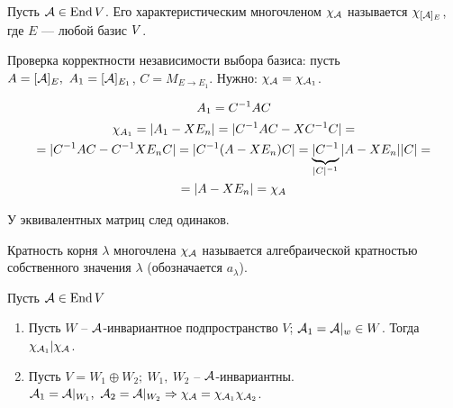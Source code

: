 \documentclass[main]{subfiles}
\begin{document}
\begin{definition}
    Пусть $\mathcal{A} \in \operatorname{End} V$. Его характеристическим многочленом $\chi_{\mathcal{A}}$ называется
    $\chi_{[\mathcal{A}]_E}$, где $E$  — любой базис $V$.
\end{definition}

Проверка корректности независимости выбора базиса: пусть $A = [\mathcal{A}]_E,\ A_1 = [\mathcal{A}]_{E_1}$,
$C = M_{E \rightarrow E_1}$. Нужно: $\chi_{\mathcal{A}} = \chi_{\mathcal{A}_1}$.

\[A_1 = C^{-1}A C\]
\begin{multline*}
    \chi_{A_1} = |A_1 - X E_n| =
    |C^{-1}A C - XC^{-1}C| = \\ = |C^{-1}A C - C^{-1}XE_nC| =
    |C^{-1}(A - XE_n) C| = \underbrace{|C^{-1}}_{|C|^{-1}}|A - XE_n||C| = \\ =
    |A - XE_n| = \chi_{A}
\end{multline*}

У эквивалентных матриц след одинаков.


\begin{definition} 
    Кратность корня $\lambda$ многочлена $\chi_{\mathcal{A}}$ называется алгебраической кратностью собственного значения $\lambda$ (обозначается $a_{\lambda}$).
\end{definition}

\begin{proposition}
    Пусть $\mathcal{A} \in \operatorname{End} V$
    \begin{enumerate}
        \item Пусть $W$ -- ${\mathcal{A}}$-инвариантное подпространство $V$; $\mathcal{A}_1 = \mathcal{A}|_w \in W$. Тогда $\chi_{\mathcal{A}_1} | \chi_{\mathcal{A}}$.
        \item Пусть $V = W_1 \oplus W_2;\ W_1,\ W_2$ -- $\mathcal{A}$-инвариантны. $\mathcal{A}_1 = \mathcal{A}|_{W_1},\ \mathcal{A}_2 = \mathcal{A}|_{W_2} \Rightarrow
                  \chi_{\mathcal{A}} = \chi_{\mathcal{A}_1}\chi_{\mathcal{A}_2}$.
    \end{enumerate}

\end{proposition}
\end{document}
